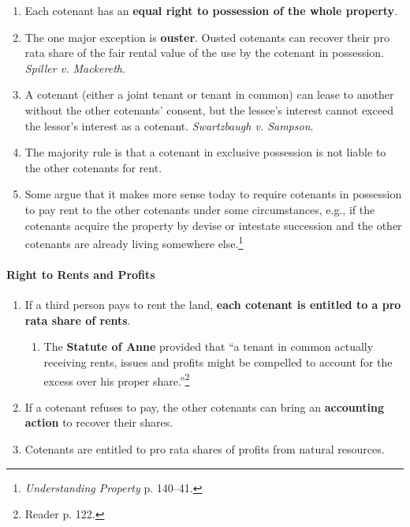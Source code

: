 \begin{enumerate}
    \item Each cotenant has an \textbf{equal right to possession of the whole 
    property}.
    \item The one major exception is \textbf{ouster}. Ousted cotenants can 
    recover their pro rata share of the fair rental value of the use by the 
    cotenant in possession. \emph{Spiller v. Mackereth}.
    \item A cotenant (either a joint tenant or tenant in common)  can lease to 
    another without the other cotenants' consent, but the lessee's interest 
    cannot exceed the lessor's interest as a cotenant.  \emph{Swartzbaugh v. 
    Sampson}.
    \item The majority rule is that a cotenant in exclusive possession is not 
    liable to the other cotenants for rent.
    \item Some argue that it makes more sense today to require cotenants in 
    possession to pay rent to the other cotenants under some circumstances, 
    e.g., if the cotenants acquire the property by devise or intestate 
    succession and the other cotenants are already living somewhere 
    else.\footnote{\emph{Understanding Property} p. 140--41.}
\end{enumerate}

\paragraph{Right to Rents and Profits}

\begin{enumerate}
    \item If a third person pays to rent the land, \textbf{each cotenant is 
    entitled to a pro rata share of rents}.
    \begin{enumerate}
        \item The \textbf{Statute of Anne} provided that ``a tenant in common 
        actually receiving rents, issues and profits might be compelled to 
        account for the excess over his proper share.''\footnote{Reader p. 
        122.}
    \end{enumerate}
    \item If a cotenant refuses to pay, the other cotenants can bring an 
    \textbf{accounting action} to recover their shares.
    \item Cotenants are entitled to pro rata shares of profits from natural 
    resources.
\end{enumerate}

